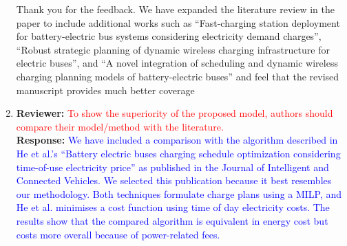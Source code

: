 \documentclass{article}
\newcommand\formatfeedback[2]
{%
	\textbf{Reviewer:} \textcolor{red}{#1} 
	\\[0.1in] \textbf{Response:} \textcolor{blue}{#2}
}
\begin{document}
\begin{enumerate}
			     {Thank you for the feedback. We have expanded the literature review in the paper to include additional works such as ``Fast-charging station deployment for battery-electric bus systems considering electricity demand charges'', ``Robust strategic planning of dynamic wireless charging infrastructure for electric buses'', and ``A novel integration of scheduling and dynamic wireless charging planning models of battery-electric buses'' and feel that the revised manuscript provides much better coverage} 
	\item \formatfeedback{To show the superiority of the proposed model, authors should compare their model/method with the literature.}%
			     {We have included a comparison with the algorithm described in He et al.'s ``Battery electric buses charging schedule optimization considering time-of-use electricity price'' as published in the Journal of Intelligent and Connected Vehicles. We selected this publication because it best resembles our methodology.  Both techniques formulate charge plans using a MILP, and He et al. minimises a cost function using time of day electricity costs. The results show that the compared algorithm is equivalent in energy cost but costs more overall because of power-related fees.}

\end{enumerate}
\end{document}
